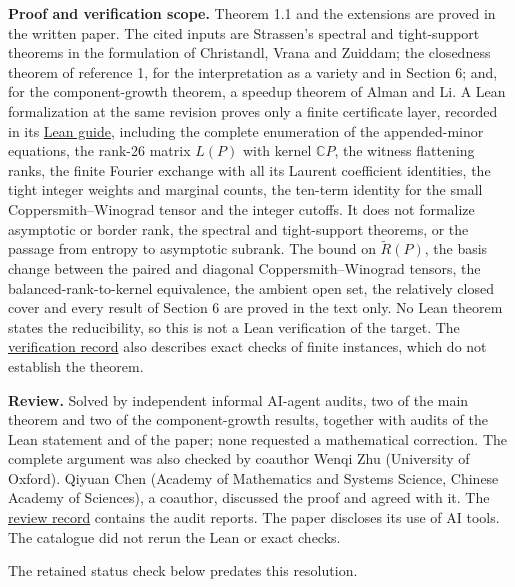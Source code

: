 \documentclass[11pt,a4paper]{article}
\begin{document}
\textbf{Proof and verification scope.} Theorem 1.1 and the extensions
are proved in the written paper. The cited inputs are Strassen's
spectral and tight-support theorems in the formulation of Christandl,
Vrana and Zuiddam; the closedness theorem of reference 1, for the
interpretation as a variety and in Section 6; and, for the
component-growth theorem, a speedup theorem of Alman and Li. A Lean
formalization at the same revision proves only a finite certificate
layer, recorded in its
\href{https://github.com/erenup/asymptotic-rank-sublevels/blob/5e35de12ef4addb8ea26486e365de00146efdfce/lean/README.md}{Lean
guide}, including the complete enumeration of the appended-minor
equations, the rank-26 matrix \(L(P)\) with kernel \(\mathbb CP\), the
witness flattening ranks, the finite Fourier exchange with all its
Laurent coefficient identities, the tight integer weights and marginal
counts, the ten-term identity for the small Coppersmith--Winograd tensor
and the integer cutoffs. It does not formalize asymptotic or border
rank, the spectral and tight-support theorems, or the passage from
entropy to asymptotic subrank. The bound on \(\widetilde R(P)\), the
basis change between the paired and diagonal Coppersmith--Winograd
tensors, the balanced-rank-to-kernel equivalence, the ambient open set,
the relatively closed cover and every result of Section 6 are proved in
the text only. No Lean theorem states the reducibility, so this is not a
Lean verification of the target. The
\href{https://github.com/erenup/asymptotic-rank-sublevels/blob/5e35de12ef4addb8ea26486e365de00146efdfce/VERIFICATION.md}{verification
record} also describes exact checks of finite instances, which do not
establish the theorem.

\textbf{Review.} Solved by independent informal AI-agent audits, two of
the main theorem and two of the component-growth results, together with
audits of the Lean statement and of the paper; none requested a
mathematical correction. The complete argument was also checked by
coauthor Wenqi Zhu (University of Oxford). Qiyuan Chen (Academy of
Mathematics and Systems Science, Chinese Academy of Sciences), a
coauthor, discussed the proof and agreed with it. The
\href{https://github.com/erenup/asymptotic-rank-sublevels/blob/5e35de12ef4addb8ea26486e365de00146efdfce/verification/reviews/README.md}{review
record} contains the audit reports. The paper discloses its use of AI
tools. The catalogue did not rerun the Lean or exact checks.

The retained status check below predates this resolution.
\end{document}
